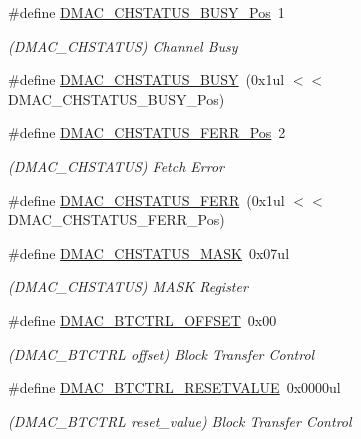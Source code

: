 \begin{DoxyCompactItemize}
\item 
\#define \mbox{\hyperlink{group___s_a_m_d21___d_m_a_c_gab4da5ea102a833a9525221616de22850}{D\+M\+A\+C\+\_\+\+C\+H\+S\+T\+A\+T\+U\+S\+\_\+\+B\+U\+S\+Y\+\_\+\+Pos}}~1
\begin{DoxyCompactList}\small\item\em (D\+M\+A\+C\+\_\+\+C\+H\+S\+T\+A\+T\+US) Channel Busy \end{DoxyCompactList}\item 
\#define \mbox{\hyperlink{group___s_a_m_d21___d_m_a_c_ga17427c2c6450dcfe7576d0970e740d0b}{D\+M\+A\+C\+\_\+\+C\+H\+S\+T\+A\+T\+U\+S\+\_\+\+B\+U\+SY}}~(0x1ul $<$$<$ D\+M\+A\+C\+\_\+\+C\+H\+S\+T\+A\+T\+U\+S\+\_\+\+B\+U\+S\+Y\+\_\+\+Pos)
\item 
\#define \mbox{\hyperlink{group___s_a_m_d21___d_m_a_c_gaa4f8c2395f4ea053b20afd513fd4cd3f}{D\+M\+A\+C\+\_\+\+C\+H\+S\+T\+A\+T\+U\+S\+\_\+\+F\+E\+R\+R\+\_\+\+Pos}}~2
\begin{DoxyCompactList}\small\item\em (D\+M\+A\+C\+\_\+\+C\+H\+S\+T\+A\+T\+US) Fetch Error \end{DoxyCompactList}\item 
\#define \mbox{\hyperlink{group___s_a_m_d21___d_m_a_c_gab2a8f0538c859cf412cdc26b3eb30a7a}{D\+M\+A\+C\+\_\+\+C\+H\+S\+T\+A\+T\+U\+S\+\_\+\+F\+E\+RR}}~(0x1ul $<$$<$ D\+M\+A\+C\+\_\+\+C\+H\+S\+T\+A\+T\+U\+S\+\_\+\+F\+E\+R\+R\+\_\+\+Pos)
\item 
\#define \mbox{\hyperlink{group___s_a_m_d21___d_m_a_c_gafb5dd45a23313443434478b289e0313b}{D\+M\+A\+C\+\_\+\+C\+H\+S\+T\+A\+T\+U\+S\+\_\+\+M\+A\+SK}}~0x07ul
\begin{DoxyCompactList}\small\item\em (D\+M\+A\+C\+\_\+\+C\+H\+S\+T\+A\+T\+US) M\+A\+SK Register \end{DoxyCompactList}\item 
\#define \mbox{\hyperlink{group___s_a_m_d21___d_m_a_c_ga7ae70add09374db15503eba80799017b}{D\+M\+A\+C\+\_\+\+B\+T\+C\+T\+R\+L\+\_\+\+O\+F\+F\+S\+ET}}~0x00
\begin{DoxyCompactList}\small\item\em (D\+M\+A\+C\+\_\+\+B\+T\+C\+T\+RL offset) Block Transfer Control \end{DoxyCompactList}\item 
\#define \mbox{\hyperlink{group___s_a_m_d21___d_m_a_c_ga972a7cc0c2f21e04d4b6123a45339876}{D\+M\+A\+C\+\_\+\+B\+T\+C\+T\+R\+L\+\_\+\+R\+E\+S\+E\+T\+V\+A\+L\+UE}}~0x0000ul
\begin{DoxyCompactList}\small\item\em (D\+M\+A\+C\+\_\+\+B\+T\+C\+T\+RL reset\+\_\+value) Block Transfer Control \end{DoxyCompactList}\item 

\end{DoxyCompactItemize}
